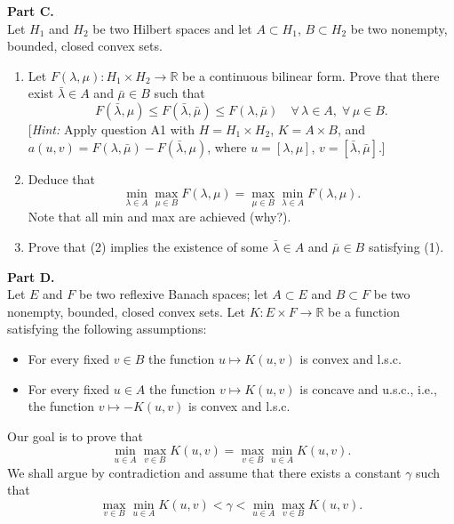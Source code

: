 \documentclass[12pt]{article}
\newcommand{\R}{\mathbb{R}}
\begin{document}
\noindent\textbf{Part C.}\\
Let $H_1$ and $H_2$ be two Hilbert spaces and let $A \subset H_1$, $B \subset H_2$ be two nonempty,
bounded, closed convex sets.
 
\begin{enumerate}
\item Let $F(\lambda,\mu) : H_1 \times H_2 \to \R$ be a continuous bilinear form. Prove that there
exist $\bar\lambda \in A$ and $\bar\mu \in B$ such that
\begin{equation}\tag{1}
F(\bar\lambda, \mu) \le F(\bar\lambda, \bar\mu) \le F(\lambda, \bar\mu) \quad \forall\, \lambda \in A,\; \forall\, \mu \in B.
\end{equation}
[\textit{Hint:} Apply question A1 with $H = H_1 \times H_2$, $K = A \times B$, and
$a(u,v) = F(\lambda, \bar\mu) - F(\bar\lambda, \mu)$, where $u = [\lambda,\mu]$, $v = [\bar\lambda,\bar\mu]$.]
 
\item Deduce that
\begin{equation}\tag{2}
\min_{\lambda \in A}\max_{\mu \in B} F(\lambda,\mu) = \max_{\mu \in B}\min_{\lambda \in A} F(\lambda,\mu).
\end{equation}
Note that all min and max are achieved (why?).
 
 
\item Prove that (2) implies the existence of some $\bar\lambda \in A$ and $\bar\mu \in B$ satisfying (1).
\end{enumerate}
 
\noindent\textbf{Part D.}\\
Let $E$ and $F$ be two reflexive Banach spaces; let $A \subset E$ and $B \subset F$ be two
nonempty, bounded, closed convex sets. Let $K : E \times F \to \R$ be a function satisfying
the following assumptions:
\begin{itemize}
\item[(a)] For every fixed $v \in B$ the function $u \mapsto K(u,v)$ is convex and l.s.c.
\item[(b)] For every fixed $u \in A$ the function $v \mapsto K(u,v)$ is concave and u.s.c., i.e., the
function $v \mapsto -K(u,v)$ is convex and l.s.c.
\end{itemize}
Our goal is to prove that
\[
\min_{u \in A}\max_{v \in B} K(u,v) = \max_{v \in B}\min_{u \in A} K(u,v).
\]
We shall argue by contradiction and assume that there exists a constant $\gamma$ such that
\[
\max_{v \in B}\min_{u \in A} K(u,v) < \gamma < \min_{u \in A}\max_{v \in B} K(u,v).
\]
 
\end{document}
